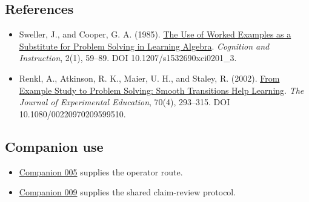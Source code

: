 \documentclass[
  11pt,
]{article}
\providecommand{\tightlist}{%
  \setlength{\itemsep}{0pt}\setlength{\parskip}{0pt}}
\begin{document}
\hypertarget{references}{%
\subsection{References}\label{references}}

\begin{itemize}
\tightlist
\item
  Sweller, J., and Cooper, G. A. (1985).
  \href{https://doi.org/10.1207/s1532690xci0201_3}{The Use of Worked
  Examples as a Substitute for Problem Solving in Learning Algebra}.
  \emph{Cognition and Instruction}, 2(1), 59--89. DOI
  10.1207/s1532690xci0201\_3.
\item
  Renkl, A., Atkinson, R. K., Maier, U. H., and Staley, R. (2002).
  \href{https://doi.org/10.1080/00220970209599510}{From Example Study to
  Problem Solving: Smooth Transitions Help Learning}. \emph{The Journal
  of Experimental Education}, 70(4), 293--315. DOI
  10.1080/00220970209599510.
\end{itemize}

\hypertarget{companion-use}{%
\subsection{Companion use}\label{companion-use}}

\begin{itemize}
\tightlist
\item
  \href{https://github.com/dbccpage/the_symbol_game/blob/52cb5457f6c485ba548cfd292f6012a941ed22cf/atlas/coda_atlas/symbol_game/005_pfp_practitioners_field_manual/paper.md}{Companion
  005} supplies the operator route.
\item
  \href{https://github.com/dbccpage/the_symbol_game/blob/52cb5457f6c485ba548cfd292f6012a941ed22cf/atlas/coda_atlas/symbol_game/009_pfp_adversarial_dialectics_and_terminal_reality_gates/paper.md}{Companion
  009} supplies the shared claim-review protocol.
\end{itemize}
\end{document}

